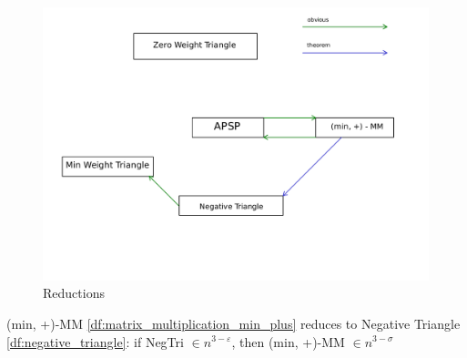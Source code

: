 \begin{figure}[ht]
	\centering
	\includegraphics[scale=0.3]{figures/6.pdf}
	\caption{Reductions}
\end{figure}

\begin{thm}
	(min, +)-MM \eqref{df:matrix_multiplication_min_plus} reduces to Negative Triangle \eqref{df:negative_triangle}: if NegTri $\in n^{3 - \varepsilon}$, then (min, +)-MM $\in n^{3 - \sigma}$
\end{thm}

